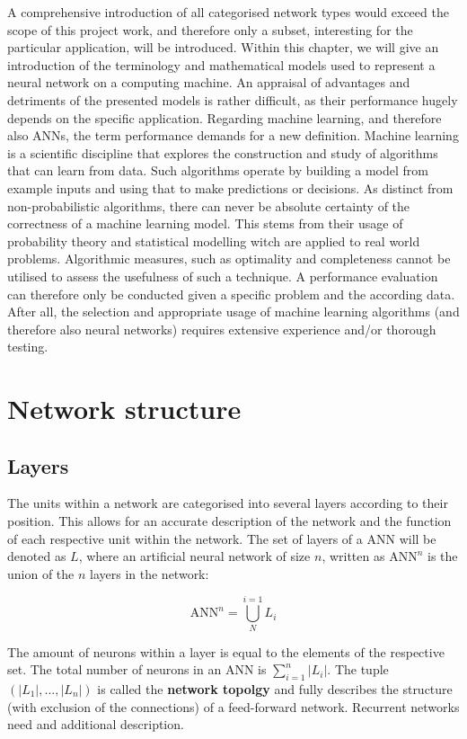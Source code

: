 \documentclass[10pt,a4paper,DIV=11]{scrreprt}
\begin{document}
A comprehensive introduction of all categorised network types would exceed the scope of this project work, and therefore only a subset, interesting for the particular application, will be introduced. 
Within this chapter, we will give an introduction of the terminology and mathematical models used to represent a neural network on a computing machine. 
An appraisal of advantages and detriments of the presented models is rather difficult, as their performance hugely depends on the specific application. 
Regarding machine learning, and therefore also ANNs, the term performance demands for a new definition. Machine learning is a scientific discipline 
that explores the construction and study of algorithms that can learn from data.\cite{MLDEF1} 
Such algorithms operate by building a model from example inputs and using that to make predictions or decisions.\cite{MLDEF2} 
As distinct from non-probabilistic algorithms, there can never be absolute certainty of the correctness of a machine learning model. 
This stems from their usage of probability theory and statistical modelling witch are applied to real world problems. 
Algorithmic measures, such as optimality and completeness cannot be utilised to assess the usefulness of such a technique.
A performance evaluation can therefore only be conducted given a specific problem and the according data. After all, the selection and 
appropriate usage of machine learning algorithms (and therefore also neural networks) requires extensive experience and/or thorough testing. 

\section{Network structure}
\subsection{Layers}
The units within a network are categorised into several layers according to their position. This allows for an accurate description of the network 
and the function of each respective unit within the network. The set of layers of a ANN will be denoted as $L$, where an artificial neural network 
of size $n$, written as $\text{ANN}^n$ is the union of the $n$ layers in the network:

\begin{equation}
    \text{ANN}^n = \bigcup_{N}^{i=1}{L_i}
\end{equation}

The amount of neurons within a layer is equal to the elements of the respective set. The total number of neurons in an ANN is 
$\sum_{i=1}^{n}{|L_i|}$. The tuple $(|L_1|,...,|L_n|)$ is called the \textbf{network topolgy} and fully describes the structure (with exclusion of the connections) 
of a feed-forward network. Recurrent networks need and additional description.
\end{document}
